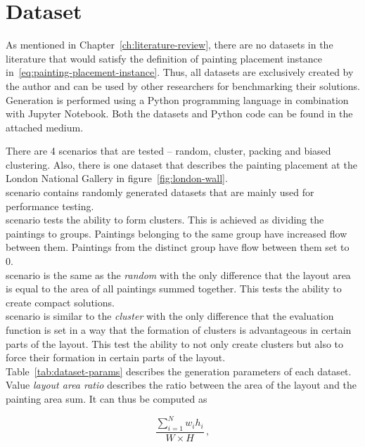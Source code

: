 \section{Dataset}\label{sec:dataset}

As mentioned in Chapter~\ref{ch:literature-review}, there are no datasets in the
literature that would satisfy the definition of painting placement instance in~\ref{eq:painting-placement-instance}.
Thus, all datasets are exclusively created by the author and can be used by other researchers
for benchmarking their solutions. Generation is performed using a Python programming language in combination with Jupyter Notebook.
Both the datasets and Python code can be found in the attached medium.

There are 4 scenarios that are tested – random, cluster, packing and biased clustering.
Also, there is one dataset that describes the painting placement at the London National Gallery in figure~\ref{fig:london-wall}. \\

 scenario contains randomly generated datasets that are mainly used for performance testing.\\

 scenario tests the ability to form clusters.
This is achieved as dividing the paintings to groups. Paintings belonging to the
same group have increased flow between them. Paintings from the distinct group have flow between
them set to 0. \\

 scenario is the same as the \textit{random} with the only difference that the layout area
is equal to the area of all paintings summed together. This tests the ability to create compact solutions.\\

 scenario is similar to the \textit{cluster} with the only difference
that the evaluation function is set in a way that the formation of clusters is advantageous in certain parts
of the layout. This test the ability to not only create clusters but also to force their formation in certain parts of the layout.\\

Table~\ref{tab:dataset-params} describes the generation parameters of each dataset. Value \textit{layout area ratio}
describes the ratio between the area of the layout and the painting area sum. It can thus be computed as

\[
    \dfrac{\sum\limits_{i=1}^{N} w_i h_i}{W \times H}\,,
\]

